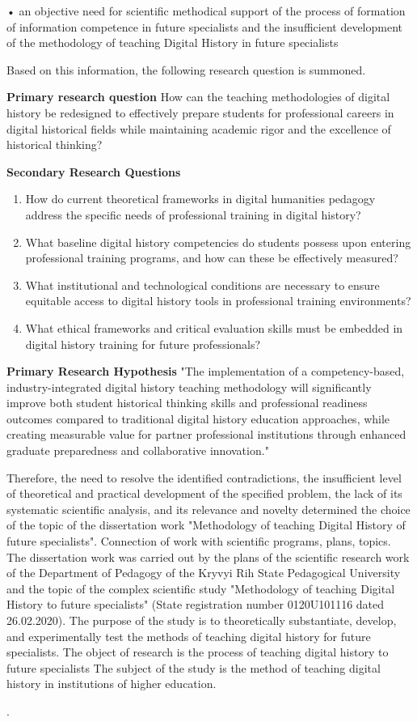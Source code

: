 {• an objective need for scientific methodical support of the process of formation of information competence in future specialists and the insufficient development of the methodology of teaching Digital History in future specialists

Based on this information, the following research question is summoned. 

\textbf{Primary research question}
How can the teaching methodologies of digital history be redesigned to effectively prepare students for professional careers in digital historical fields while maintaining academic rigor and the excellence of historical thinking?

\textbf{Secondary Research Questions}
\begin{enumerate}
  \item How do current theoretical frameworks in digital humanities pedagogy address the specific needs of professional training in digital history?
  \item What baseline digital history competencies do students possess upon entering professional training programs, and how can these be effectively measured?
  \item What institutional and technological conditions are necessary to ensure equitable access to digital history tools in professional training environments?
  \item What ethical frameworks and critical evaluation skills must be embedded in digital history training for future professionals?
\end{enumerate}


\textbf{Primary Research Hypothesis}
"The implementation of a competency-based, industry-integrated digital history teaching methodology will significantly improve both student historical thinking skills and professional readiness outcomes compared to traditional digital history education approaches, while creating measurable value for partner professional institutions through enhanced graduate preparedness and collaborative innovation."

Therefore, the need to resolve the identified contradictions, the insufficient level of theoretical and practical development of the specified problem, the lack of its systematic scientific analysis, and its relevance and novelty determined the choice of the topic of the dissertation work "Methodology of teaching Digital History of future specialists".
Connection of work with scientific programs, plans, topics. The dissertation work was carried out by the plans of the scientific research work of the Department of Pedagogy of the Kryvyi Rih State Pedagogical University and the topic of the complex scientific study "Methodology of teaching Digital History to future specialists" (State registration number 0120U101116 dated 26.02.2020).
The purpose of the study is to theoretically substantiate, develop, and experimentally test the methods of teaching digital history for future specialists.
The object of research is the process of teaching digital history to future specialists
The subject of the study is the method of teaching digital history in institutions of higher education.

.
}